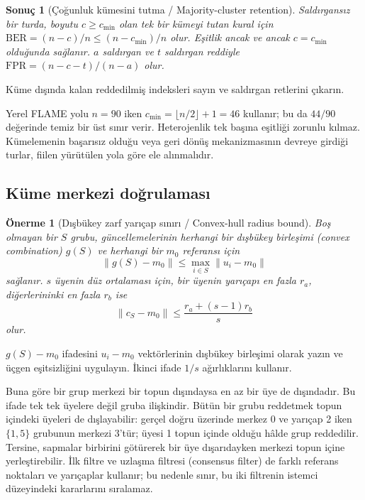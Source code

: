 \documentclass[journal]{IEEEtran}
\newtheorem{proposition}{Önerme}
\newtheorem{corollary}{Sonuç}
\newcommand{\BER}{\mathrm{BER}}
\begin{document}
\begin{corollary}[Çoğunluk kümesini tutma / Majority-cluster retention]\label{cor:majority}
Saldırgansız bir turda, boyutu $c\geq c_{\min}$ olan tek bir kümeyi tutan kural için $\BER=(n-c)/n\leq(n-c_{\min})/n$ olur. Eşitlik ancak ve ancak $c=c_{\min}$ olduğunda sağlanır. $a$ saldırgan ve $t$ saldırgan reddiyle $\mathrm{FPR}=(n-c-t)/(n-a)$ olur.
\end{corollary}
\begin{IEEEproof}
Küme dışında kalan reddedilmiş indeksleri sayın ve saldırgan retlerini çıkarın.
\end{IEEEproof}
Yerel FLAME yolu $n=90$ iken $c_{\min}=\lfloor n/2\rfloor+1=46$ kullanır; bu da $44/90$ değerinde temiz bir üst sınır verir. Heterojenlik tek başına eşitliği zorunlu kılmaz. Kümelemenin başarısız olduğu veya geri dönüş mekanizmasının devreye girdiği turlar, fiilen yürütülen yola göre ele alınmalıdır.

\subsection{Küme merkezi doğrulaması}
\begin{proposition}[Dışbükey zarf yarıçap sınırı / Convex-hull radius bound]\label{prop:contraction}
Boş olmayan bir $S$ grubu, güncellemelerinin herhangi bir dışbükey birleşimi (convex combination) $g(S)$ ve herhangi bir $m_0$ referansı için
\[
\|g(S)-m_0\|\leq\max_{i\in S}\|u_i-m_0\|
\]
sağlanır. $s$ üyenin düz ortalaması için, bir üyenin yarıçapı en fazla $r_a$, diğerlerininki en fazla $r_b$ ise
\[
\|c_S-m_0\|\leq\frac{r_a+(s-1)r_b}{s}
\]
olur.
\end{proposition}
\begin{IEEEproof}
$g(S)-m_0$ ifadesini $u_i-m_0$ vektörlerinin dışbükey birleşimi olarak yazın ve üçgen eşitsizliğini uygulayın. İkinci ifade $1/s$ ağırlıklarını kullanır.
\end{IEEEproof}
Buna göre bir grup merkezi bir topun dışındaysa en az bir üye de dışındadır. Bu ifade tek tek üyelere değil gruba ilişkindir. Bütün bir grubu reddetmek topun içindeki üyeleri de dışlayabilir: gerçel doğru üzerinde merkez 0 ve yarıçap 2 iken $\{1,5\}$ grubunun merkezi 3'tür; üyesi 1 topun içinde olduğu hâlde grup reddedilir. Tersine, sapmalar birbirini götürerek bir üye dışarıdayken merkezi topun içine yerleştirebilir. İlk filtre ve uzlaşma filtresi (consensus filter) de farklı referans noktaları ve yarıçaplar kullanır; bu nedenle sınır, bu iki filtrenin istemci düzeyindeki kararlarını sıralamaz.
\end{document}
